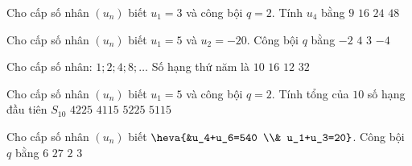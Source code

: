 \begin{ex}%
Cho cấp số nhân $\left(u_n\right)$ biết $u_1=3$ và công bội $q=2$. Tính $u_4$ bằng
\choice
{$9$}
{$16$}
{\True $24$}
{$48$}
\end{ex}
\begin{ex}%
Cho cấp số nhân $\left(u_n\right)$ biết $u_1=5$ và $u_2=-20$. Công bội $q$ bằng
\choice
{$-2$}
{$4$}
{$3$}
{\True $-4$}
\end{ex}
\begin{ex}%
Cho cấp số nhân: $1 ; 2 ; 4 ; 8 ; \ldots$ Số hạng thứ năm là
\choice
{$10$}
{\True $16$}
{$12$}
{$32$}
\end{ex}
\begin{ex}%
Cho cấp số nhân $\left(u_n\right)$ biết $u_1=5$ và công bội $q=2$. Tính tổng của $10$ số hạng đầu tiên $S_{10}$
\choice
{$4225$}
{$4115$}
{$5225$}
{\True $5115$}
\end{ex}
\begin{ex}%
Cho cấp số nhân $\left(u_n\right)$ biết $\heva{&u_4+u_6=540 \\& u_1+u_3=20}$. Công bội $q$ bằng
\choice
{$6$}
{$27$}
{$2$}
{\True$3$}
\end{ex}


